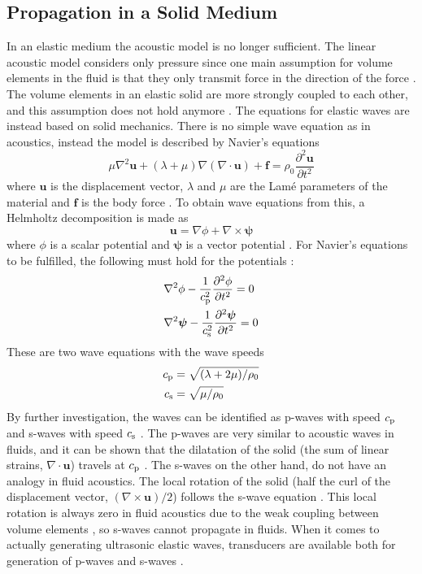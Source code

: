 \documentclass[11pt,twoside]{eitExjobb}
\begin{document}
	\subsection{Propagation in a Solid Medium \label{sec:th-prop-solid}}
	In an elastic medium the acoustic model is no longer sufficient. The linear acoustic model considers only pressure since one main assumption for volume elements in the fluid is that they only transmit force in the direction of the force \cite{Kaufman2000}. The volume elements in an elastic solid are more strongly coupled to each other, and this assumption does not hold anymore \cite{Kaufman2005}. The equations for elastic waves are instead based on solid mechanics. There is no simple wave equation as in acoustics, instead the model is described by Navier's equations
	\begin{equation*}
		\mu \nabla^2 \bm{u} + (\lambda+\mu) \nabla (\nabla \cdot \bm{u}) + \bm{f} = \rho_0 \frac{\partial^2 \bm{u}}{\partial t^2}
	\end{equation*}
	where $\bm{u}$ is the displacement vector, $\lambda$ and $\mu$ are the Lamé parameters of the material and $\bm{f}$ is the body force \cite{Schmerr2016}. To obtain wave equations from this, a Helmholtz decomposition is made as
	\begin{equation*}
		\bm{u} = \nabla \phi + \nabla \times \bm{\psi}
	\end{equation*}
	where $\phi$ is a scalar potential and $\bm{\psi}$ is a vector potential \cite{Schmerr2016}. For Navier's equations to be fulfilled, the following must hold for the potentials \cite{Schmerr2016}:
	\begin{align*}
		&\nabla^2 \phi - \frac{1}{c_{\mathrm{p}}^2} \frac{\partial^2 \phi}{\partial t^2} = 0 \\
		&\nabla^2 \bm{\psi} - \frac{1}{c_{\mathrm{s}}^2} \frac{\partial^2 \bm{\psi}}{\partial t^2} = 0
	\end{align*}
	These are two wave equations with the wave speeds \cite{Schmerr2016}
	\begin{align*}
		c_{\mathrm{p}} &= \sqrt{(\lambda + 2\mu)/\rho_0} \\
		c_{\mathrm{s}} &= \sqrt{\mu/\rho_0}
	\end{align*}
	By further investigation, the waves can be identified as p-waves with speed $c_{\mathrm{p}}$ and s-waves with speed $c_{\mathrm{s}}$ \cite{Schmerr2016}. The p-waves are very similar to acoustic waves in fluids, and it can be shown that the dilatation of the solid (the sum of linear strains, $\nabla \cdot \bm{u}$) travels at $c_{\mathrm{p}}$ \cite{Schmerr2016}. The s-waves on the other hand, do not have an analogy in fluid acoustics. The local rotation of the solid (half the curl of the displacement vector, $(\nabla \times \bm{u})/2$) follows the s-wave equation \cite{Schmerr2016}. This local rotation is always zero in fluid acoustics due to the weak coupling between volume elements \cite{Kaufman2000}, so s-waves cannot propagate in fluids. When it comes to actually generating ultrasonic elastic waves, transducers are available both for generation of p-waves and s-waves \cite{Schmerr2016}.
	
\end{document}
